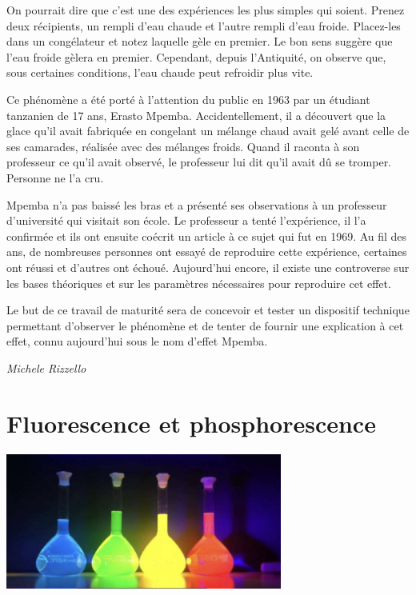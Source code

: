 \documentclass[
  10pt,
  french,
  a5paper,
  openany]{book}
\newenvironment{signature}{\begin{flushright}}{\end{flushright}}
\begin{document}
On pourrait dire que c'est une des expériences les plus simples qui soient. Prenez deux récipients, un rempli d'eau chaude et l'autre rempli d'eau froide. Placez-les dans un congélateur et notez laquelle gèle en premier. Le bon sens suggère que l'eau froide gèlera en premier. Cependant, depuis l'Antiquité, on observe que, sous certaines conditions, l'eau chaude peut refroidir plus vite.

Ce phénomène a été porté à l'attention du public en 1963 par un étudiant tanzanien de 17 ans, Erasto Mpemba. Accidentellement, il a découvert que la glace qu'il avait fabriquée en congelant un mélange chaud avait gelé avant celle de ses camarades, réalisée avec des mélanges froids. Quand il raconta à son professeur ce qu'il avait observé, le professeur lui dit qu'il avait dû se tromper. Personne ne l'a cru.

Mpemba n'a pas baissé les bras et a présenté ses observations à un professeur d'université qui visitait son école. Le professeur a tenté l'expérience, il l'a confirmée et ils ont ensuite coécrit un article à ce sujet qui fut en 1969. Au fil des ans, de nombreuses personnes ont essayé de reproduire cette expérience, certaines ont réussi et d'autres ont échoué. Aujourd'hui encore, il existe une controverse sur les bases théoriques et sur les paramètres nécessaires pour reproduire cet effet.

Le but de ce travail de maturité sera de concevoir et tester un dispositif technique permettant d'observer le phénomène et de tenter de fournir une explication à cet effet, connu aujourd'hui sous le nom d'effet Mpemba.

\begin{signature}
\emph{Michele Rizzello}

\end{signature}

\hypertarget{fluorescence-et-phosphorescence}{%
\chapter{Fluorescence et phosphorescence}\label{fluorescence-et-phosphorescence}}

\begin{center}
\includegraphics[width=\textwidth,height=12em]{images/fluorescence-et-phosphorescence.jpg}

\end{center}
\end{document}

